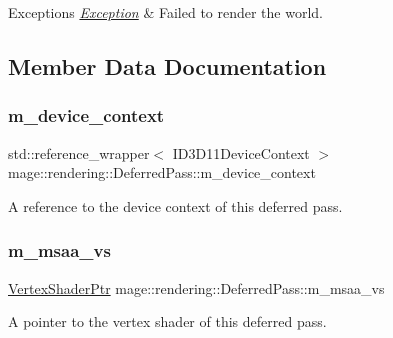 \begin{DoxyExceptions}{Exceptions}
{\em \hyperlink{classmage_1_1_exception}{Exception}} & Failed to render the world. \\
\hline
\end{DoxyExceptions}


\subsection{Member Data Documentation}
\hypertarget{classmage_1_1rendering_1_1_deferred_pass_afd07209849a7969475c9110fbdb0c4a4}{}\label{classmage_1_1rendering_1_1_deferred_pass_afd07209849a7969475c9110fbdb0c4a4} 
\subsubsection{\texorpdfstring{m\+\_\+device\+\_\+context}{m\_device\_context}}
{\footnotesize\ttfamily std\+::reference\+\_\+wrapper$<$ I\+D3\+D11\+Device\+Context $>$ mage\+::rendering\+::\+Deferred\+Pass\+::m\+\_\+device\+\_\+context\hspace{0.3cm}{\ttfamily [private]}}

A reference to the device context of this deferred pass. \hypertarget{classmage_1_1rendering_1_1_deferred_pass_aea0ac2159ea383b80fcbc603a6b86363}{}\label{classmage_1_1rendering_1_1_deferred_pass_aea0ac2159ea383b80fcbc603a6b86363} 
\subsubsection{\texorpdfstring{m\+\_\+msaa\+\_\+vs}{m\_msaa\_vs}}
{\footnotesize\ttfamily \hyperlink{namespacemage_1_1rendering_aaf704b9c54a4181f4950a1761de69dda}{Vertex\+Shader\+Ptr} mage\+::rendering\+::\+Deferred\+Pass\+::m\+\_\+msaa\+\_\+vs\hspace{0.3cm}{\ttfamily [private]}}

A pointer to the vertex shader of this deferred pass. \hypertarget{classmage_1_1rendering_1_1_deferred_pass_a542cc2833e2df7b7697f2c1d769dce36}{}\label{classmage_1_1rendering_1_1_deferred_pass_a542cc2833e2df7b7697f2c1d769dce36} 
